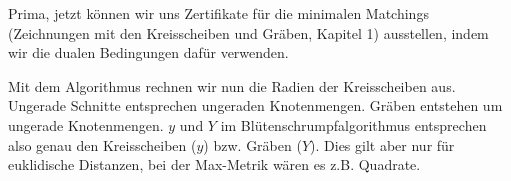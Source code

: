 Prima, jetzt können wir uns Zertifikate für die minimalen Matchings
(Zeichnungen mit den Kreisscheiben und Gräben, Kapitel 1) ausstellen, indem wir die
dualen Bedingungen dafür verwenden.

Mit dem Algorithmus rechnen wir nun die Radien der Kreisscheiben aus.
Ungerade Schnitte entsprechen ungeraden Knotenmengen. Gräben entstehen um
ungerade Knotenmengen. $y$ und $Y$ im Blütenschrumpfalgorithmus entsprechen
also genau den Kreisscheiben ($y$) bzw. Gräben ($Y$). Dies gilt aber nur
für euklidische Distanzen, bei der Max-Metrik wären es z.B. Quadrate.




